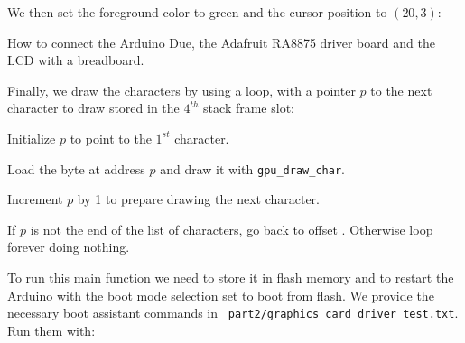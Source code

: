 We then set the foreground color to green and the cursor position to $(20, 3)$:

\begin{TwoColumns}
\end{TwoColumns}

\begin{Figure}
  

  \caption{How to connect the Arduino Due, the Adafruit RA8875 driver board and
    the LCD with a breadboard.}\label{fig:lcd-connection}
\end{Figure}

Finally, we draw the characters by using a loop, with a pointer $p$ to the next
character to draw stored in the $4^{th}$ stack frame slot:

\begin{Paragraph}
\begin{paracol}{2}
Initialize $p$ to point to the $1^{st}$ character.


Load the byte at address $p$ and draw it with \verb!gpu_draw_char!.


Increment $p$ by 1 to prepare drawing the next character.


If $p$ is not the end of the list of characters, go back to offset
. Otherwise loop forever doing
nothing.

\end{paracol}
\end{Paragraph}

To run this main function we need to store it in flash memory and to restart
the Arduino with the boot mode selection set to boot from flash. We provide the
necessary boot assistant commands in {\tt
part2/graphics\_card\_driver\_test.txt}. Run them with:


